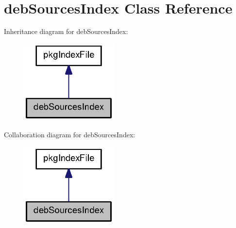 \section{deb\-Sources\-Index \-Class \-Reference}
\label{classdebSourcesIndex}


\-Inheritance diagram for deb\-Sources\-Index\-:
\nopagebreak
\begin{figure}[H]
\begin{center}
\leavevmode
\includegraphics[width=140pt]{classdebSourcesIndex__inherit__graph}
\end{center}
\end{figure}


\-Collaboration diagram for deb\-Sources\-Index\-:
\nopagebreak
\begin{figure}[H]
\begin{center}
\leavevmode
\includegraphics[width=140pt]{classdebSourcesIndex__coll__graph}
\end{center}
\end{figure}
